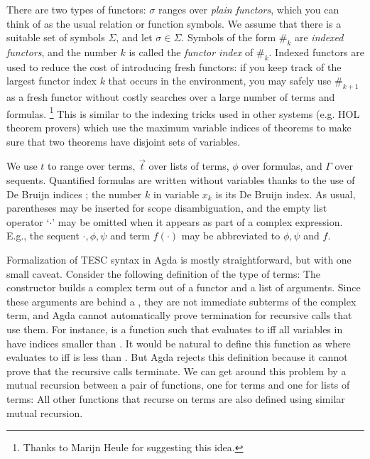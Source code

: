 \documentclass{lipics-v2021}
\newcommand{\idf}[1]{\#_{#1}}
\begin{document}
There are two types of functors: $\sigma$ ranges over \textit{plain functors}, 
which you can think of as the usual relation or function symbols. We assume that there 
is a suitable set of symbols $\Sigma$, and let $\sigma \in \Sigma$.
Symbols of the form $\idf{k}$ are \textit{indexed functors}, and the number $k$ is 
called the \textit{functor index} of $\idf{k}$. Indexed functors are used to reduce 
the cost of introducing fresh functors: if you keep track of the largest functor index
$k$ that occurs in the environment, you may safely use $\idf{k+1}$ as a fresh functor
without costly searches over a large number of terms and formulas. \footnote{Thanks to Marijn Heule for suggesting this idea.}
This is similar to the indexing tricks used in other systems (e.g. HOL theorem provers)
which use the maximum variable indices of theorems to make sure that two theorems 
have disjoint sets of variables.

We use $t$ to range over terms, $\vec{t}$ over lists of terms, $\phi$ over formulas, 
and $\Gamma$ over sequents. Quantified formulas are written without variables thanks 
to the use of De Bruijn indices \cite{de1972lambda}; the number $k$ in variable $x_k$ is its De Bruijn index. 
As usual, parentheses may be inserted for scope disambiguation, and the empty list operator 
`$\cdot$' may be omitted when it appears as part of a complex expression. E.g., the sequent 
$\cdot, \phi, \psi$ and term $f(\cdot)$ may be abbreviated to $\phi, \psi$ and $f$.

Formalization of TESC syntax in Agda is mostly straightforward, but with one
small caveat. Consider the following definition of the type of terms:
The constructor  builds a complex term out of a 
functor and a list of arguments. Since these arguments are behind a ,
they are not immediate subterms of the complex term, and Agda cannot automatically 
prove termination for recursive calls that use them. For instance, 
 \AgdaSymbol{:} 
    is 
a function such that    
evaluates to  iff all variables in  
have indices smaller than . It would be natural to define this
function as 
where    evaluates to 
 iff  is less than .
But Agda rejects this definition because it cannot prove that the recursive 
calls terminate. We can get around this problem by a mutual recursion 
between a pair of functions, one for terms and one for lists of terms: 
All other functions that recurse on terms are also defined using similar
mutual recursion.
\end{document}

